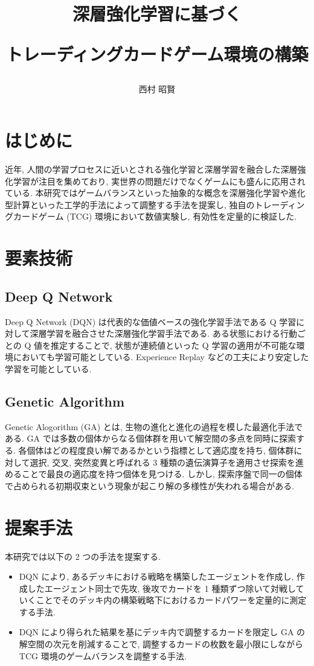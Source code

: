 \documentclass[a4paper,twoside,twocolumn,10pt]{article}
\title{深層強化学習に基づく
\par
トレーディングカードゲーム環境の構築}
\author{西村 昭賢}
\begin{document}
\maketitle %
\small

\section{はじめに}
近年, 人間の学習プロセスに近いとされる強化学習と深層学習を融合した深層強化学習が注目を集めており, 実世界の問題だけでなくゲームにも盛んに応用されている.
本研究ではゲームバランスといった抽象的な概念を深層強化学習や進化型計算といった工学的手法によって調整する手法を提案し, 独自のトレーディングカードゲーム (TCG) 環境において数値実験し, 有効性を定量的に検証した.

\section{要素技術}
\subsection{Deep Q Network}
Deep Q Network (DQN) \cite{DQN} は代表的な価値ベースの強化学習手法である Q 学習に対して深層学習を融合させた深層強化学習手法である.
ある状態における行動ごとの Q 値を推定することで, 状態が連続値といった Q 学習の適用が不可能な環境においても学習可能としている. Experience Replay などの工夫により安定した学習を可能としている.

\subsection{Genetic Algorithm}
Genetic Alogorithm (GA) とは, 生物の進化と進化の過程を模した最適化手法である. GA では多数の個体からなる個体群を用いて解空間の多点を同時に探索する. 各個体はどの程度良い解であるかという指標として適応度を持ち, 個体群に対して選択, 交叉, 突然変異と呼ばれる 3 種類の遺伝演算子を適用させ探索を進めることで最良の適応度を持つ個体を見つける. しかし, 探索序盤で同一の個体で占められる初期収束という現象が起こり解の多様性が失われる場合がある.

\section{提案手法}
本研究では以下の 2 つの手法を提案する.
\begin{itemize}
  \item DQN により, あるデッキにおける戦略を構築したエージェントを作成し, 作成したエージェント同士で先攻, 後攻でカードを 1 種類ずつ除いて対戦していくことでそのデッキ内の構築戦略下におけるカードパワーを定量的に測定する手法.
  \item DQN により得られた結果を基にデッキ内で調整するカードを限定し GA の解空間の次元を削減することで, 調整するカードの枚数を最小限にしながら TCG 環境のゲームバランスを調整する手法.
\end{itemize}
\end{document}
